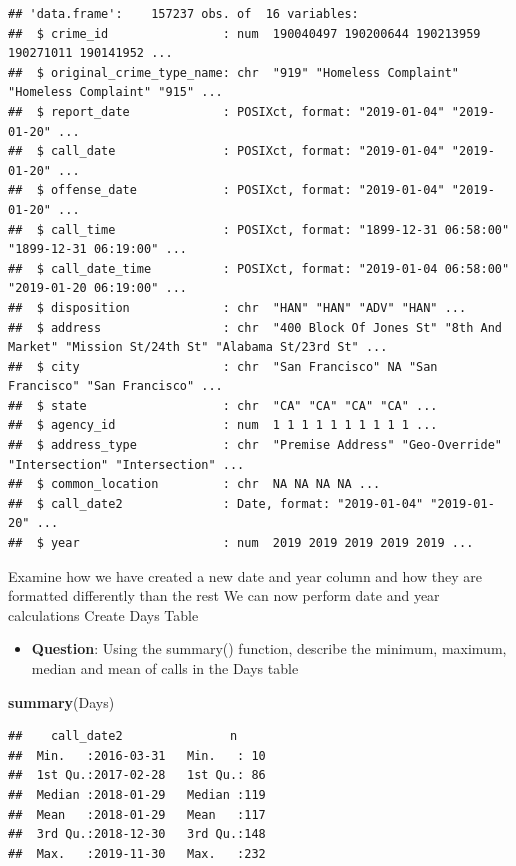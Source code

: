 \documentclass[]{book}
\newenvironment{Shaded}{\begin{snugshade}}{\end{snugshade}}
\newcommand{\KeywordTok}[1]{\textcolor[rgb]{0.13,0.29,0.53}{\textbf{#1}}}
\newcommand{\NormalTok}[1]{#1}
\providecommand{\tightlist}{%
  \setlength{\itemsep}{0pt}\setlength{\parskip}{0pt}}
\begin{document}
\begin{verbatim}
## 'data.frame':    157237 obs. of  16 variables:
##  $ crime_id                : num  190040497 190200644 190213959 190271011 190141952 ...
##  $ original_crime_type_name: chr  "919" "Homeless Complaint" "Homeless Complaint" "915" ...
##  $ report_date             : POSIXct, format: "2019-01-04" "2019-01-20" ...
##  $ call_date               : POSIXct, format: "2019-01-04" "2019-01-20" ...
##  $ offense_date            : POSIXct, format: "2019-01-04" "2019-01-20" ...
##  $ call_time               : POSIXct, format: "1899-12-31 06:58:00" "1899-12-31 06:19:00" ...
##  $ call_date_time          : POSIXct, format: "2019-01-04 06:58:00" "2019-01-20 06:19:00" ...
##  $ disposition             : chr  "HAN" "HAN" "ADV" "HAN" ...
##  $ address                 : chr  "400 Block Of Jones St" "8th And Market" "Mission St/24th St" "Alabama St/23rd St" ...
##  $ city                    : chr  "San Francisco" NA "San Francisco" "San Francisco" ...
##  $ state                   : chr  "CA" "CA" "CA" "CA" ...
##  $ agency_id               : num  1 1 1 1 1 1 1 1 1 1 ...
##  $ address_type            : chr  "Premise Address" "Geo-Override" "Intersection" "Intersection" ...
##  $ common_location         : chr  NA NA NA NA ...
##  $ call_date2              : Date, format: "2019-01-04" "2019-01-20" ...
##  $ year                    : num  2019 2019 2019 2019 2019 ...
\end{verbatim}

Examine how we have created a new date and year column and how they are formatted differently than the rest
We can now perform date and year calculations
Create Days Table

\begin{itemize}
\tightlist
\item
  \textbf{Question}: Using the summary() function, describe the minimum, maximum, median and mean of calls in the Days table
\end{itemize}

\begin{Shaded}
\begin{Highlighting}[]
\KeywordTok{summary}\NormalTok{(Days)}
\end{Highlighting}
\end{Shaded}

\begin{verbatim}
##    call_date2               n      
##  Min.   :2016-03-31   Min.   : 10  
##  1st Qu.:2017-02-28   1st Qu.: 86  
##  Median :2018-01-29   Median :119  
##  Mean   :2018-01-29   Mean   :117  
##  3rd Qu.:2018-12-30   3rd Qu.:148  
##  Max.   :2019-11-30   Max.   :232
\end{verbatim}
\end{document}
